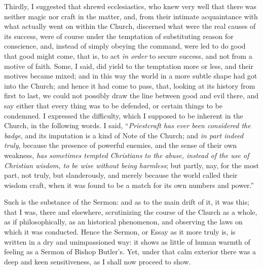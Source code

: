 Thirdly, I suggested that shrewd ecclesiastics, who knew very well
that there was neither magic nor craft in the matter, and, from their
intimate acquaintance with what actually went on within the Church,
discerned what were the real causes of its success, were of course under
the temptation of substituting reason for conscience, and, instead of
simply obeying the command, were led to do good that good might come,
that is, to act \emph{in order} to secure success, and not from a motive of faith. Some, I said, did yield
to the temptation more or less, and their motives became mixed; and in
this way the world in a more subtle shape had got into the Church; and
hence it had come to
pass, that, looking at its history from first to last, we could not possibly draw the line between good and evil there, and say
either that every thing was to be defended, or certain things to be condemned. I expressed the difficulty, which I supposed to
be inherent in the Church, in the following words. I said, ``\emph{Priestcraft
has ever been considered the badge}, and its imputation is a kind of
Note of the Church; and \emph{in part indeed truly}, because the
presence of powerful enemies, and the sense of their own weakness, \emph{has
sometimes tempted Christians to the abuse, instead of the use of
Christian wisdom, to be wise without being harmless}; but partly,
nay, for the most part, not truly, but slanderously, and merely because
the world called their wisdom craft, when it was found to be a match for
its own numbers and power.''

Such is the substance of the Sermon: and as to the main drift of it,
it was this; that I was, there and elsewhere, scrutinizing the course of
the Church as a whole, as if philosophically, as an historical
phenomenon, and observing the laws on which it was conducted. Hence the Sermon, or Essay as it more truly is, is written in a dry and
unimpassioned way: it shows as little of human warmth of feeling as a Sermon of Bishop Butler's. Yet, under that calm exterior
there was a deep and keen sensitiveness, as I shall now proceed to show.

